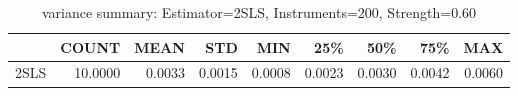\begin{table}[ht]
\centering
\caption{variance summary: Estimator=2SLS, Instruments=200, Strength=0.60}
\begin{tabular}{lrrrrrrrr}
\toprule
 & COUNT & MEAN & STD & MIN & 25\% & 50\% & 75\% & MAX \\
\midrule
2SLS & 10.0000 & 0.0033 & 0.0015 & 0.0008 & 0.0023 & 0.0030 & 0.0042 & 0.0060 \\
\bottomrule
\end{tabular}
\end{table}
